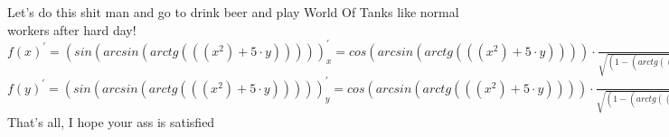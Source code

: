 \documentclass{article}
\begin{document}
Let's do this shit man and go to drink beer and play World Of Tanks like normal workers after hard day!\newline \newline
$f(x)^\prime = ( sin(  arcsin(  arctg( ((x ^{ 2}) + 5 \cdot y)))))_{x}^\prime =  cos(  arcsin(  arctg( ((x ^{ 2}) + 5 \cdot y)))) \cdot  \frac{ 1}{\sqrt{(1 - ( arctg( ((x ^{ 2}) + 5 \cdot y)) ^{ 2}))}} \cdot  \frac{ 1}{(1 + (((x ^{ 2}) + 5 \cdot y) ^{ 2}))} \cdot x \cdot 2$ \newline \newline
$f(y)^\prime = ( sin(  arcsin(  arctg( ((x ^{ 2}) + 5 \cdot y)))))_{y}^\prime =  cos(  arcsin(  arctg( ((x ^{ 2}) + 5 \cdot y)))) \cdot  \frac{ 1}{\sqrt{(1 - ( arctg( ((x ^{ 2}) + 5 \cdot y)) ^{ 2}))}} \cdot  \frac{ 1}{(1 + (((x ^{ 2}) + 5 \cdot y) ^{ 2}))} \cdot 5$ \newline \newline	That's all, I hope your ass is satisfied\newline
\end{document}

